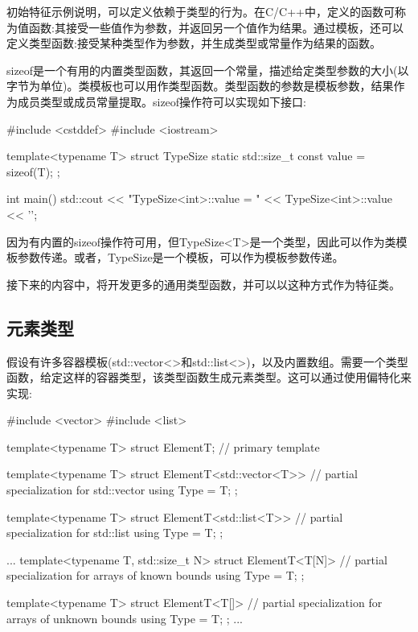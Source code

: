 
初始特征示例说明，可以定义依赖于类型的行为。在C/C++中，定义的函数可称为值函数:其接受一些值作为参数，并返回另一个值作为结果。通过模板，还可以定义类型函数:接受某种类型作为参数，并生成类型或常量作为结果的函数。

sizeof是一个有用的内置类型函数，其返回一个常量，描述给定类型参数的大小(以字节为单位)。类模板也可以用作类型函数。类型函数的参数是模板参数，结果作为成员类型或成员常量提取。sizeof操作符可以实现如下接口:

\begin{cpp}
#include <cstddef>
#include <iostream>

template<typename T>
struct TypeSize {
	static std::size_t const value = sizeof(T);
};

int main()
{
	std::cout << "TypeSize<int>::value = "
	<< TypeSize<int>::value << ’\n’;
}
\end{cpp}

因为有内置的sizeof操作符可用，但TypeSize<T>是一个类型，因此可以作为类模板参数传递。或者，TypeSize是一个模板，可以作为模板参数传递。

接下来的内容中，将开发更多的通用类型函数，并可以以这种方式作为特征类。

\subsection{元素类型}

假设有许多容器模板(std::vector<>和std::list<>)，以及内置数组。需要一个类型函数，给定这样的容器类型，该类型函数生成元素类型。这可以通过使用偏特化来实现:

\begin{cpp}
#include <vector>
#include <list>

template<typename T>
struct ElementT; // primary template

template<typename T>
struct ElementT<std::vector<T>> { // partial specialization for std::vector
	using Type = T;
};

template<typename T>
struct ElementT<std::list<T>> { // partial specialization for std::list
	using Type = T;
};

...
template<typename T, std::size_t N>
struct ElementT<T[N]> { // partial specialization for arrays of known bounds
	using Type = T;
};

template<typename T>
struct ElementT<T[]> { // partial specialization for arrays of unknown bounds
	using Type = T;
};
...
\end{cpp}

